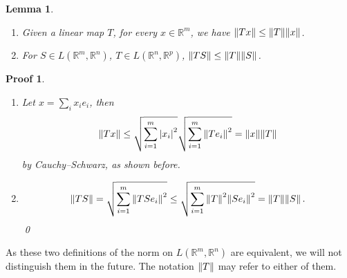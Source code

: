 \documentclass{article}
\theoremstyle{plain}\theoremheaderfont{\normalfont\itshape}\theorembodyfont{\rmfamily}\theoremseparator{.}\newtheorem*{rem}{Remark}\newtheorem*{ex}{Example}\newtheorem*{proof}{Proof}\newtheorem*{altp}{Alternative proof}
\theoremstyle{plain}\theoremheaderfont{\normalfont\bfseries}\theorembodyfont{\rmfamily}\theoremseparator{.}\newtheorem{thm}{Theorem}[section]\newtheorem{lem}[thm]{Lemma}\newtheorem{prop}[thm]{Proposition}\newtheorem*{cor}{Corollary}\newtheorem{defn}[thm]{Definition}\newtheorem{clm}[thm]{Claim}\newtheorem{clminproof}{Claim}
\theoremstyle{break}\theoremheaderfont{\normalfont\itshape}\theorembodyfont{\rmfamily}\theoremseparator{.\medskip}\newtheorem*{proofskip}{Proof}\newtheorem*{exs}{Examples}\newtheorem*{rems}{Remarks}
\theoremstyle{break}\theoremheaderfont{\normalfont\bfseries}\theorembodyfont{\rmfamily}\theoremseparator{.\medskip}\newtheorem{lemskip}[thm]{Lemma}\newtheorem{defnskip}[thm]{Definition}\newtheorem{propskip}[thm]{Proposition}\newtheorem{thmskip}[thm]{Theorem}
\newcommand{\qed}{\hfill\ensuremath{\Box}}
\begin{document}
    \begin{lemskip}
        \begin{enumerate}[label=(\roman*),topsep=0pt]
            \item Given a linear map \(T\), for every \(x\in\mathbb{R}^m\), we have \(\norm{Tx}\le\norm{T}\norm{x}\).
            \item For \(S\in L(\mathbb{R}^m,\mathbb{R}^n)\), \(T\in L(\mathbb{R}^n,\mathbb{R}^p)\), \(\norm{TS}\le\norm{T}\norm{S}\).
        \end{enumerate}
    \end{lemskip}
    \begin{proofskip}
        \begin{enumerate}[label=(\roman*),topsep=0pt]
            \item Let \(x=\sum_i x_i e_i\), then
            \begin{align*}
                \norm{Tx}\le\sqrt{\sum_{i=1}^{m}\abs{x_i}^2}\sqrt{\sum_{i=1}^{m}\norm{Te_i}^2}=\norm{x}\norm{T}
            \end{align*}
            by Cauchy--Schwarz, as shown before.
            \item
            \[\norm{TS}=\sqrt{\sum_{i=1}^{m}\norm{TSe_i}^2}\le\sqrt{\sum_{i=1}^{m}\norm{T}^2\norm{Se_i}^2}=\norm{T}\norm{S}\,.\]\qed
        \end{enumerate}
    \end{proofskip}

    As these two definitions of the norm on \(L(\mathbb{R}^m,\mathbb{R}^n)\) are equivalent, we will not distinguish them in the future. The notation \(\norm{T}\) may refer to either of them.
\end{document}
